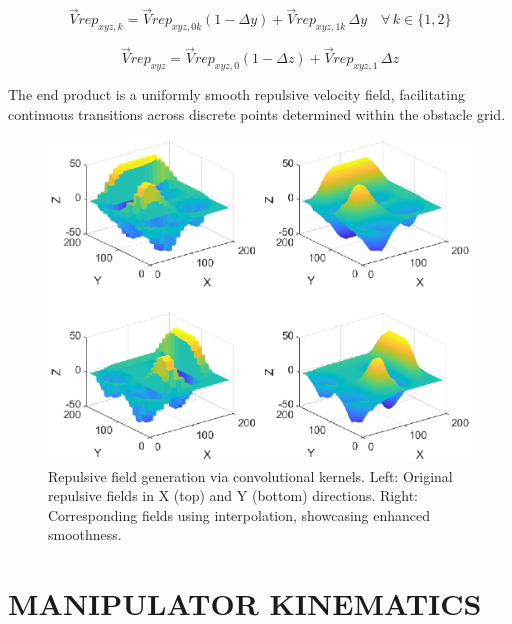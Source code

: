 \documentclass[letterpaper, 10 pt, conference]{ieeeconf}  %
\begin{document}
\begin{equation}
	\label{eq: interp y}
	\vec{V}rep_{xyz,k} = \vec{V}rep_{xyz,0k}(1 - \Delta y) + \vec{V}rep_{xyz,1k} \, \Delta y \quad \forall \, k \in \{1, 2\}
\end{equation}

\begin{equation}
	\label{eq: interp z}
	\vec{V}rep_{xyz} = \vec{V}rep_{xyz,0}(1 - \Delta z) + \vec{V}rep_{xyz,1} \, \Delta z 
\end{equation}


The end product is a uniformly smooth repulsive velocity field, facilitating continuous transitions across discrete points determined within the obstacle grid.

\begin{figure}
	\centering
	\includegraphics[width=1\linewidth]{non_and_interp_4_plots.eps} %
	\caption{Repulsive field generation via convolutional kernels. Left: Original repulsive fields in X (top) and Y (bottom) directions. Right: Corresponding fields using interpolation, showcasing enhanced smoothness.}
	\label{fig:interp-experiment}
\end{figure}

\section{MANIPULATOR KINEMATICS}
\end{document}
